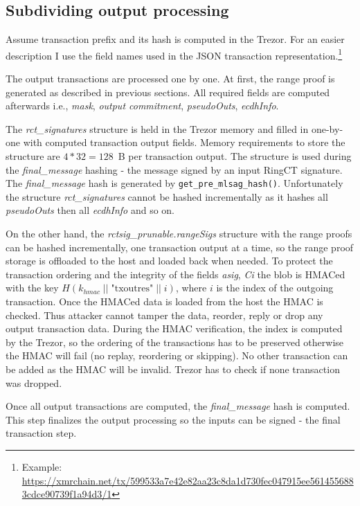 \documentclass[]{article}
\begin{document}
\subsection{Subdividing output processing}
Assume transaction prefix and its hash is computed in the Trezor.
For an easier description I use the field names used in the JSON transaction representation.\footnote{Example: \url{https://xmrchain.net/tx/599533a7e42e82aa23c8da1d730fec047915ee5614556883cdce90739f1a94d3/1}}

The output transactions are processed one by one. At first, the range proof is generated as described in previous sections. All required fields are computed afterwards i.e., \emph{mask}, \emph{output commitment}, \emph{pseudoOuts}, \emph{ecdhInfo}. 

The \emph{rct\_signatures} structure is held in the Trezor memory and filled in one-by-one with computed transaction output fields. Memory requirements to store the structure are $4 * 32 = 128$~B per transaction output. The structure is used during the \emph{final\_message} hashing - the message signed by an input RingCT signature. The \emph{final\_message} hash is generated by \verb|get_pre_mlsag_hash()|. Unfortunately the structure \emph{rct\_signatures} cannot be hashed incrementally as it hashes all \emph{pseudoOuts} then all \emph{ecdhInfo} and so on.

On the other hand, the \emph{rctsig\_prunable.rangeSigs} structure with the range proofs can be hashed incrementally, one transaction output at a time, so the range proof storage is offloaded to the host and loaded back when needed. To protect the transaction ordering and the integrity of the fields \emph{asig}, \emph{Ci} the blob is HMACed with the key $H(k_{hmac} \; || \; \text{"txoutres"} \; || \; i)$, where $i$ is the index of the outgoing transaction. Once the HMACed data is loaded from the host the HMAC is checked. Thus attacker cannot tamper the data, reorder, reply or drop any output transaction data. During the HMAC verification, the index is computed by the Trezor, so the ordering of the transactions has to be preserved otherwise the HMAC will fail (no replay, reordering or skipping). No other transaction can be added as the HMAC will be invalid. Trezor has to check if none transaction was dropped.

Once all output transactions are computed, the \emph{final\_message} hash is computed. This step finalizes the output processing so the inputs can be signed - the final transaction step.
\end{document}
